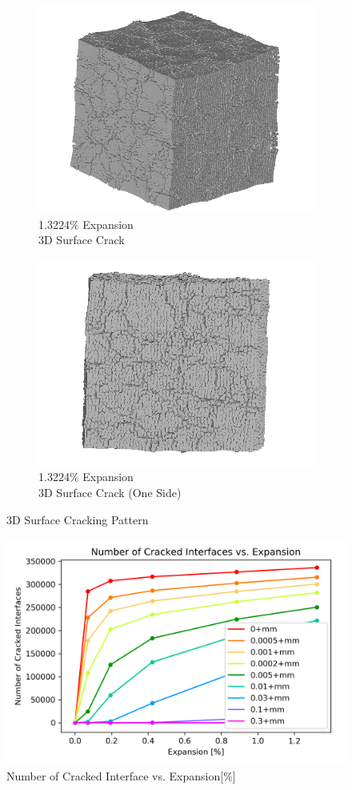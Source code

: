 \begin{figure}[ht!]
    \begin{subfigure}{.5\textwidth}
      \centering
      \includegraphics[width=0.5\linewidth]{Files/exp_3D/ASR/A30P75_5_3d.png}
      \caption{1.3224\% Expansion\\3D Surface Crack}
    \end{subfigure}%
    \begin{subfigure}{.5\textwidth}
      \centering
      \includegraphics[width=0.5\linewidth]{Files/exp_3D/ASR/A30P75_5_3ds.png}
      \caption{1.3224\% Expansion\\3D Surface Crack (One Side)}
    \end{subfigure}%

\caption{3D Surface Cracking Pattern}
\label{fig:A30_3Dcrack}
\end{figure}

\begin{figure}[ht!]
\centering
\includegraphics[width=.8\linewidth]{Files/interface/A30P75CRACK.png}
  \caption{Number of Cracked Interface vs. Expansion[\%]}
  \label{A30P75CRACK}
\end{figure}
